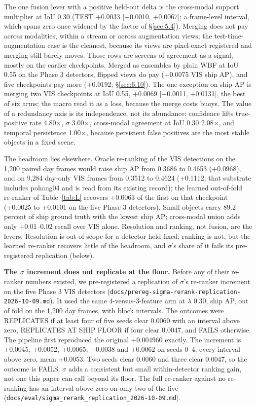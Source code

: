 \documentclass[10pt]{article}
\begin{document}
The one fusion lever with a positive held-out delta is the cross-modal support multiplier at IoU 0.30 (TEST +0.0033 [+0.0010, +0.0067]; a frame-level interval, which spans zero once widened by the factor of \S\ref{sec:5.4}). Merging does not pay across modalities, within a stream or across augmentation views; the test-time-augmentation case is the cleanest, because its views are pixel-exact registered and merging still barely moves. Those rows are screens of agreement as a signal, mostly on the earlier checkpoints. Merged as ensembles by plain WBF at IoU 0.55 on the Phase 3 detectors, flipped views do pay (+0.0075 VIS ship AP), and five checkpoints pay more (+0.0192; \S\ref{sec:6.10}). The one exception on ship AP is merging two VIS checkpoints at IoU 0.55, +0.0069 [+0.0011, +0.0131], the best of six arms; the macro read it as a loss, because the merge costs buoys. The value of a redundancy axis is its independence, not its abundance: confidence lifts true-positive rate 4.80$\times$, $\sigma$ 3.00$\times$, cross-modal agreement at IoU 0.30 2.08$\times$, and temporal persistence 1.00$\times$, because persistent false positives are the most stable objects in a fixed scene.

The headroom lies elsewhere. Oracle re-ranking of the VIS detections on the 1,200 paired day frames would raise ship AP from 0.3686 to 0.4653 (+0.0968), and on 9,284 day-only VIS frames from 0.3512 to 0.4624 (+0.1112; that substrate includes pohang04 and is read from its existing record); the learned out-of-fold re-ranker of Table~\ref{tab:L} recovers +0.0063 of the first on that checkpoint (+0.0025 to +0.0101 on the five Phase 3 detectors). Small objects carry 89.2 percent of ship ground truth with the lowest ship AP; cross-modal union adds only +0.01--0.02 recall over VIS alone. Resolution and ranking, not fusion, are the levers. Resolution is out of scope for a detector held fixed; ranking is not, but the learned re-ranker recovers little of the headroom, and $\sigma$'s share of it fails its pre-registered replication (below).

\textbf{The $\sigma$ increment does not replicate at the floor.} Before any of their re-ranker numbers existed, we pre-registered a replication of $\sigma$'s re-ranker increment on the five Phase 3 VIS detectors (\texttt{docs/\allowbreak{}prereg-sigma-rerank-replication-2026-10-09.md}). It used the same 4-versus-3-feature arm at $\lambda$ 0.30, ship AP, out of fold on the 1,200 day frames, with block intervals. The outcomes were REPLICATES if at least four of five seeds clear 0.0060 with an interval above zero, REPLICATES AT SHIP FLOOR if four clear 0.0047, and FAILS otherwise. The pipeline first reproduced the original +0.004960 exactly. The increment is +0.0045, +0.0052, +0.0065, +0.0038 and +0.0062 on seeds 0--4, every interval above zero, mean +0.0053. Two seeds clear 0.0060 and three clear 0.0047, so the outcome is FAILS. $\sigma$ adds a consistent but small within-detector ranking gain, not one this paper can call beyond its floor. The full re-ranker against no re-ranking has an interval above zero on only two of the five (\texttt{docs/\allowbreak{}eval/\allowbreak{}sigma\_\allowbreak{}rerank\_\allowbreak{}replication\_\allowbreak{}2026-10-09.md}).
\end{document}
